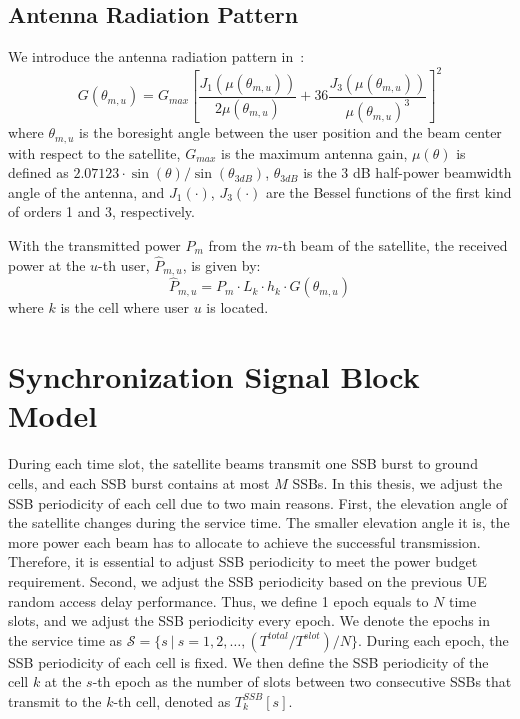 \subsection{Antenna Radiation Pattern}
We introduce the antenna radiation pattern in~\cite{Energy-Efficient}:
\begin{equation}
    G(\theta_{m,u}) = G_{max} \left[ \frac{J_1\left(\mu(\theta_{m,u})\right)}{2\mu(\theta_{m,u})}
    + 36 \frac{J_3\left(\mu(\theta_{m,u})\right)}{\mu(\theta_{m,u})^3} \right]^2
\end{equation}
where $\theta_{m,u}$ is the boresight angle between the user position and the beam center with respect to the satellite, $G_{max}$ is the maximum antenna gain, $\mu(\theta)$ is defined as $2.07123 \cdot \sin(\theta)/\sin(\theta_{3dB})$, $\theta_{3dB}$ is the 3 dB half-power beamwidth angle of the antenna, and $J_1(\cdot)$, $J_3(\cdot)$ are the Bessel functions of the first kind of orders 1 and 3, respectively.

With the transmitted power $P_{m}$ from the $m$-th beam of the satellite, the received power at the $u$-th user, $\hat{P}_{m,u}$, is given by:
\begin{equation}
    \hat{P}_{m,u} = P_{m} \cdot L_{k} \cdot h_{k} \cdot G(\theta_{m,u})
\end{equation}
where $k$ is the cell where user $u$ is located.

\section{Synchronization Signal Block Model}

During each time slot, the satellite beams transmit one SSB burst to ground cells, and each SSB burst contains at most $M$ SSBs. In this thesis, we adjust the SSB periodicity of each cell due to two main reasons. First, the elevation angle of the satellite changes during the service time. The smaller elevation angle it is, the more power each beam has to allocate to achieve the successful transmission. Therefore, it is essential to adjust SSB periodicity to meet the power budget requirement. Second, we adjust the SSB periodicity based on the previous UE random access delay performance. Thus, we define 1 epoch equals to $N$ time slots, and we adjust the SSB periodicity every epoch. We denote the epochs in the service time as $\mathcal{S} = \{s\ |\ s = 1, 2, \ldots, (T^{total} / T^{slot}) / N\}$. During each epoch, the SSB periodicity of each cell is fixed. We then define the SSB periodicity of the cell $k$ at the $s$-th epoch as the number of slots between two consecutive SSBs that transmit to the $k$-th cell, denoted as $T^{SSB}_k[s]$. 

